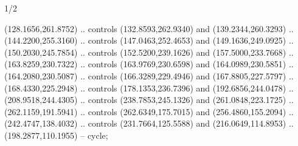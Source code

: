 \begin{flagdescription}{1/2}
\begin{scope}[y=-\flagwidth/600, x=\flagwidth/600,shift={(0,-600)}]
\begin{scope}[cm={{0.79146,0.0,0.0,0.78939,(-6.93659,3.01275)}}]
  (128.1656,261.8752) .. controls (132.8593,262.9340) and (139.2344,260.3293) ..
  (144.2200,255.3160) .. controls (147.0463,252.4653) and (149.1636,249.0925) ..
  (150.2030,245.7854) .. controls (152.5200,239.1626) and (157.5000,233.7668) ..
  (163.8259,230.7322) .. controls (163.9769,230.6598) and (164.0989,230.5851) ..
  (164.2080,230.5087) .. controls (166.3289,229.4946) and (167.8805,227.5797) ..
  (168.4330,225.2948) .. controls (178.1353,236.7396) and (192.6856,244.0478) ..
  (208.9518,244.4305) .. controls (238.7853,245.1326) and (261.0848,223.1725) ..
  (262.1159,191.5941) .. controls (262.6349,175.7015) and (256.4860,155.2094) ..
  (242.4747,138.4032) .. controls (231.7664,125.5588) and (216.0649,114.8953) ..
  (198.2877,110.1955) -- cycle;
\end{scope}
\end{scope}
\framecode{}
\end{flagdescription}
